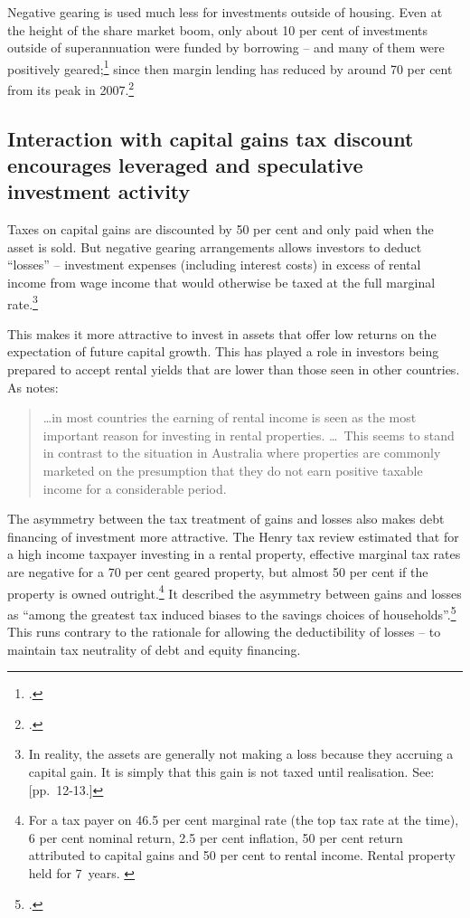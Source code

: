 \documentclass{grattan}\usepackage[]{graphicx}\usepackage[]{color}
\begin{document}
Negative gearing is used much less for investments outside of housing. Even at the height of the share market boom, only about 10 per cent of investments outside of superannuation were funded by borrowing -- and many of them were positively geared;\footcite{Daley2007}  since then margin lending has reduced by around 70 per cent from its peak in 2007.\footcite{RBA2015a}
\subsection{Interaction with capital gains tax discount encourages leveraged and speculative investment activity}
Taxes on capital gains are discounted by 50 per cent and only paid when the asset is sold. But negative gearing arrangements allows investors to deduct ``losses'' -- investment expenses  (including interest costs) in excess of rental income from wage income that would otherwise be taxed at the full marginal rate.\footnote{In reality, the assets are generally not making a loss because they accruing a capital gain. It is simply that this gain is not taxed until realisation. See: \textcite{ACOSS}[pp.~12-13.]}

This makes it more attractive to invest in assets that offer low returns on the expectation of future capital growth. This has played a role in investors being prepared to accept rental yields that are lower than those seen in other countries. As \textcite[p.~42]{RBA2014} notes:

\begin{quote}
\dots in most countries the earning of rental income is seen as the most important reason for investing in rental properties. \dots\ This seems to stand in contrast to the situation in Australia where properties are commonly marketed on the presumption that they do not earn positive taxable income for a considerable period.
\end{quote}

The asymmetry between the tax treatment of gains and losses also makes debt financing of investment more attractive. The Henry tax review estimated that for a high income taxpayer investing in a rental property, effective marginal tax rates are negative for a 70 per cent geared property, but almost 50 per cent if the property is owned outright.\footnote{For a tax payer on 46.5 per cent marginal rate (the top tax rate at the time), 6 per cent nominal return, 2.5 per cent inflation, 50 per cent return attributed to capital gains and 50 per cent to rental income. Rental property held for 7~years. \textcite[p.~74]{Treasury2010}}  It described the asymmetry between gains and losses as ``among the greatest tax induced biases to the savings choices of households''.\footcite[p.~69]{Treasury2010}  This runs contrary to the rationale for allowing the deductibility of losses -- to maintain tax neutrality of debt and equity financing. 
\end{document}
